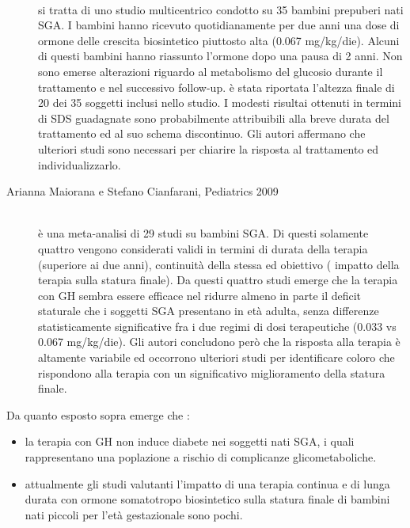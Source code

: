 \begin{description}
\item[{\parbox[t]{18cm}{Myriam Rosilio et al,\\European journal of endocrinology 2005}}] \hfill \\
 si tratta di uno studio multicentrico condotto su 35 bambini prepuberi nati SGA. I bambini hanno ricevuto quotidianamente per due anni una dose di ormone delle crescita biosintetico piuttosto alta (0.067 mg/kg/die). Alcuni di questi bambini hanno riassunto l'ormone dopo una pausa di 2 anni. Non sono emerse alterazioni riguardo al metabolismo del glucosio durante il trattamento e nel successivo follow-up. è stata riportata l'altezza finale di 20 dei 35 soggetti inclusi nello studio. I modesti risultai ottenuti in termini di SDS guadagnate sono probabilmente attribuibili alla breve durata del trattamento ed al suo schema discontinuo. Gli autori affermano che ulteriori studi sono necessari per chiarire la risposta al trattamento ed individualizzarlo.

\item[Arianna Maiorana e Stefano Cianfarani, Pediatrics 2009] \hfill \\
 è una meta-analisi di 29 studi su bambini SGA. Di questi solamente quattro vengono considerati validi in termini di durata della terapia (superiore ai due anni), continuità della stessa ed obiettivo ( impatto della terapia sulla statura finale).  Da questi quattro studi  emerge che la terapia con GH sembra essere efficace nel ridurre almeno in parte il deficit staturale che i soggetti SGA presentano in età adulta, senza differenze statisticamente significative fra i due regimi di dosi terapeutiche (0.033 vs 0.067 mg/kg/die). Gli autori concludono però che la risposta alla terapia è altamente variabile ed occorrono ulteriori studi per identificare coloro che rispondono alla terapia con un significativo miglioramento della statura finale.  

\end{description}

Da quanto esposto sopra emerge che :
\begin{itemize}
\item la terapia con GH non induce diabete nei soggetti nati SGA, i quali rappresentano una poplazione a rischio di complicanze glicometaboliche.
\item attualmente gli studi valutanti l'impatto di una terapia continua e di lunga durata 
con ormone somatotropo biosintetico sulla statura finale di bambini nati piccoli per l'età gestazionale sono pochi.
\end{itemize}

